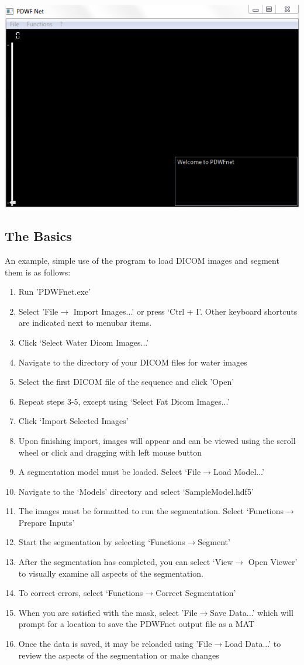 \documentclass[twoside,a4paper]{refart}
\begin{document}
\includegraphics[width=.7\textwidth]{InitialInterface}

\subsection{The Basics}

An example, simple use of the program to load DICOM images and segment them is as follows:

\begin{enumerate}
	\item Run 'PDWFnet.exe'
	\item Select 'File$\rightarrow$ Import Images...' or press `Ctrl + I'. Other keyboard shortcuts are indicated next to menubar items.
	\item Click `Select Water Dicom Images...'
	\item Navigate to the directory of your DICOM files for water images
	\item Select the first DICOM file of the sequence and click 'Open'
	\item Repeat steps 3-5, except using `Select Fat Dicom Images...'
	\item Click `Import Selected Images'
	\item Upon finishing import, images will appear and can be viewed using the scroll wheel or click and dragging with left mouse button
	\item A segmentation model must be loaded. Select `File$\rightarrow$Load Model...'
	\item Navigate to the `Models' directory and select `SampleModel.hdf5'
	\item The images must be formatted to run the segmentation. Select `Functions$\rightarrow$Prepare Inputs'
	\item Start the segmentation by selecting `Functions$\rightarrow$Segment'
	\item After the segmentation has completed, you can select `View$\rightarrow$ Open Viewer' to visually examine all aspects of the segmentation.
	\item To correct errors, select `Functions$\rightarrow$Correct Segmentation'
	\item When you are satisfied with the mask, select 'File$\rightarrow$Save Data...' which will prompt for a location to save the PDWFnet output file as a MAT
	\item Once the data is saved, it may be reloaded using 'File$\rightarrow$Load Data...' to review the aspects of the segmentation or make changes

\end{enumerate}
\end{document}
